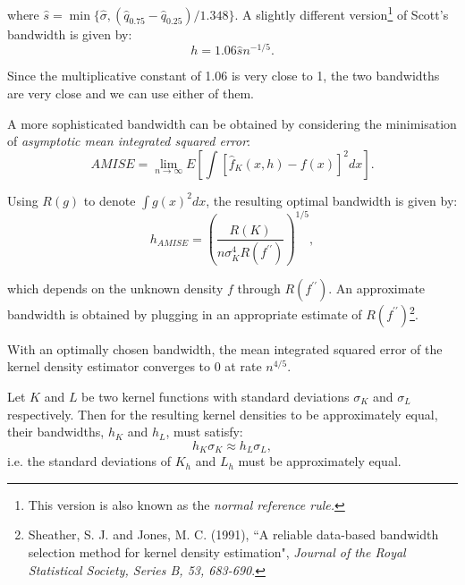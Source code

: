 where $\hat{s}=\min\{\hat{\sigma},(\hat{q}_{0.75}-\hat{q}_{0.25})/1.348\}$. A slightly different version\footnote{This version is also known as the {\it normal reference rule.}} of Scott's bandwidth is given by:
\begin{equation}
h=1.06\hat{s}n^{-1/5}.
\end{equation}

Since the multiplicative constant of 1.06 is very close to 1, the two bandwidths are very close and we can use either of them.

A more sophisticated bandwidth can be obtained by considering the minimisation of {\it asymptotic mean integrated squared error}:
\begin{equation}
AMISE=\lim_{n\rightarrow\infty}E[\int[\hat{f}_K(x,h)-f(x)]^2dx].
\end{equation}

Using $R(g)$ to denote $\int g(x)^2dx$, the resulting optimal bandwidth is given by:
\begin{equation}
h_{AMISE}=\left(\frac{R(K)}{n\sigma^4_KR(f^{\prime\prime})}\right)^{1/5},
\end{equation}

which depends on the unknown density $f$ through $R(f^{\prime\prime})$. An approximate bandwidth is obtained by plugging in an appropriate estimate of $R(f^{\prime\prime})$\footnote{Sheather, S. J. and Jones, M. C. (1991), \textquotedblleft A reliable data-based bandwidth selection method for kernel density estimation", {\it Journal of the Royal Statistical Society, Series B, 53, 683-690}.}.

With an optimally chosen bandwidth, the mean integrated squared error of the kernel density estimator converges to 0 at rate $n^{4/5}$.

Let $K$ and $L$ be two kernel functions with standard deviations $\sigma_K$ and $\sigma_L$ respectively. Then for the resulting kernel densities to be approximately equal, their bandwidths, $h_K$ and $h_L$, must satisfy:
\begin{equation}
h_K\sigma_K\approx h_L\sigma_L,
\end{equation}
i.e. the standard deviations of $K_h$ and $L_h$ must be approximately equal.

